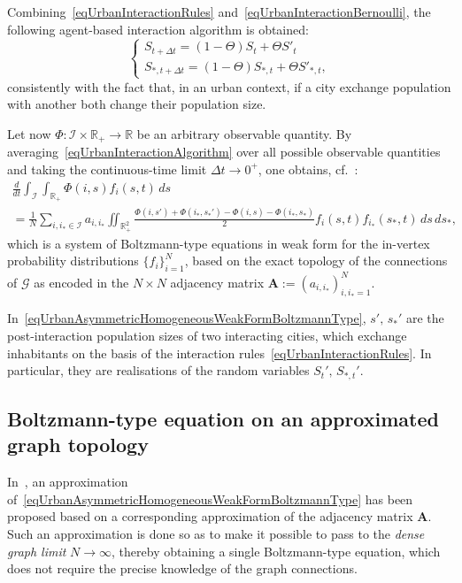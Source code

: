 \documentclass[a4paper]{article}
\newcommand{\R}{\mathbb{R}}
\begin{document}
Combining~\eqref{eqUrbanInteractionRules} and~\eqref{eqUrbanInteractionBernoulli}, the following agent-based interaction algorithm is obtained:
\begin{equation}
    \begin{cases}
        S_{t+\Delta t}=(1-\Theta)S_t+\Theta S'_t \\
        S_{\ast,t+\Delta t}=(1-\Theta)S_{\ast,t}+\Theta S'_{\ast,t},
    \end{cases}
    \label{eqUrbanInteractionAlgorithm}
\end{equation}
consistently with the fact that, in an urban context, if a city exchange population with another both change their population size.

Let now $\Phi:\mathcal I\times\R_+\to\R$ be an arbitrary observable quantity. By averaging~\eqref{eqUrbanInteractionAlgorithm} over all possible observable quantities and taking the continuous-time limit $\Delta{t}\to 0^+$, one obtains, cf.~\cite{Nurisso2024}:
\begin{multline}
    \frac{d}{dt}\int_{\mathcal I}\int_{\R_+}\Phi(i,s)f_i(s,t)\,ds \\
    =\frac{1}{N}\sum_{i,i_\ast\in\mathcal I}a_{i,i_\ast}\iint_{\R_+^2}\frac{\Phi(i,s')+\Phi(i_\ast,s_\ast')-\Phi(i,s)-\Phi(i_\ast,s_\ast)}{2}
        f_i(s,t)f_{i_\ast}(s_\ast,t)\,ds\,ds_\ast,
    \label{eqUrbanAsymmetricHomogeneousWeakFormBoltzmannType}
\end{multline}
which is a system of Boltzmann-type equations in weak form for the in-vertex probability distributions $\{f_i\}_{i=1}^{N}$, based on the exact topology of the connections of $\mathcal G$ as encoded in the $N\times N$ adjacency matrix $\mathbf{A}:=(a_{i,i_\ast})_{i,i_\ast=1}^{N}$.

In~\eqref{eqUrbanAsymmetricHomogeneousWeakFormBoltzmannType}, $s',\,s_\ast'$ are the post-interaction population sizes of two interacting cities, which exchange inhabitants on the basis of the interaction rules~\eqref{eqUrbanInteractionRules}. In particular, they are realisations of the random variables $S_t',\,S_{\ast,t}'$.

\subsection{Boltzmann-type equation on an approximated graph topology}
\label{secApproximatedBoltzmannType}
%
In~\cite{Nurisso2024}, an approximation of~\eqref{eqUrbanAsymmetricHomogeneousWeakFormBoltzmannType} has been proposed based on a corresponding approximation of the adjacency matrix $\mathbf A$. Such an approximation is done so as to make it possible to pass to the \textit{dense graph limit} $N\to\infty$, thereby obtaining a single Boltzmann-type equation, which does not require the precise knowledge of the graph connections.
\end{document}
